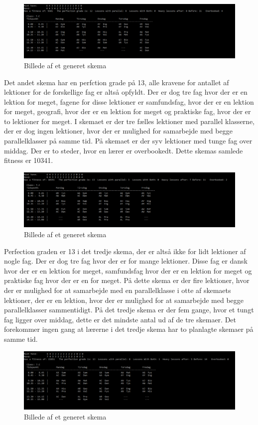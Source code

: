 \begin{figure}[!h]
\includegraphics[width=\textwidth]{partials/graphics/fitness1.png}
\caption{Billede af et generet skema}
\label{fitness1}
\end{figure}

Det andet skema har en perfction grade på 13, alle kravene for antallet af lektioner for de forskellige fag er altså opfyldt. Der er dog tre fag hvor der er en lektion for meget, fagene for disse lektioner er samfundsfag, hvor der er en lektion for meget, geografi, hvor der er en lektion for meget og praktiske fag, hvor der er to lektioner for meget. I skemaet er der tre fælles lektioner med parallel klasserne, der er dog ingen lektioner, hvor der er mulighed for samarbejde med begge parallelklasser på samme tid. På skemaet er der syv lektioner med tunge fag over middag. Der er to steder, hvor en lærer er overbookedt. Dette skemas samlede fitness er 10341.
\begin{figure}[!h]
\includegraphics[width=\textwidth]{partials/graphics/fitness2.png}
\caption{Billede af et generet skema}
\label{fitness2}
\end{figure}

Perfection graden er 13 i det tredje skema, der er altså ikke for lidt lektioner af nogle fag. Der er dog tre fag hvor der er for mange lektioner. Disse fag er dansk hvor der er en lektion for meget, samfundsfag hvor der er en lektion for meget og praktiske fag hvor der er en for meget. På dette skema er der fire lektioner, hvor der er mulighed for at samarbejde med en parallelklasse i otte af skemaets lektioner, der er en lektion, hvor der er mulighed for at samarbejde med begge parallelklasser sammentidigt. På det tredje skema er der fem gange, hvor et tungt fag ligger over middag, dette er det mindste antal ud af de tre skemaer. Det forekommer ingen gang at lærerne i det tredje skema har to planlagte skemaer på samme tid. 
\begin{figure}[!h]
\includegraphics[width=\textwidth]{partials/graphics/fitness3.png}
\caption{Billede af et generet skema}
\label{fitness3}
\end{figure}

